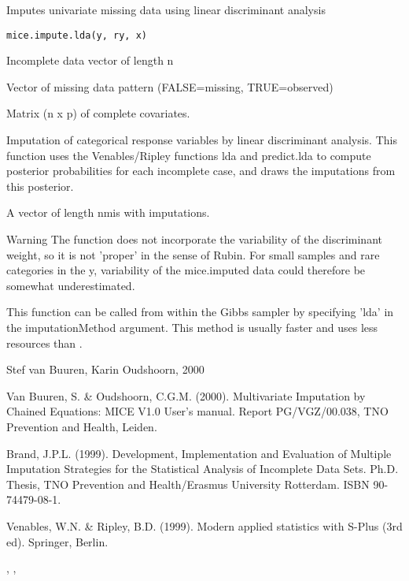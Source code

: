 \begin{Description}\relax
Imputes univariate missing data using linear discriminant analysis
\end{Description}
\begin{Usage}
\begin{verbatim}
mice.impute.lda(y, ry, x)
\end{verbatim}
\end{Usage}
\begin{Arguments}
\begin{ldescription}
\item[\code{y}] Incomplete data vector of length n
\item[\code{ry}] Vector of missing data pattern (FALSE=missing, TRUE=observed)
\item[\code{x}] Matrix (n x p) of complete covariates.
\end{ldescription}
\end{Arguments}
\begin{Details}\relax
Imputation of categorical response variables by linear discriminant
analysis. This function uses the Venables/Ripley functions
lda and predict.lda to compute posterior probabilities for
each incomplete case, and draws the imputations from this 
posterior.
\end{Details}
\begin{Value}
A vector of length nmis with imputations.
\end{Value}
\begin{Section}{Warning}
The function does not incorporate the variability of the discriminant 
weight, so it is not 'proper' in the sense of Rubin. For small samples
and rare categories in the y, variability of the mice.imputed data could 
therefore be somewhat underestimated.
\end{Section}
\begin{Note}\relax
This function can be called from within the Gibbs sampler by specifying 
'lda' in the imputationMethod argument. 
This method is usually faster and uses less resources than 
.
\end{Note}
\begin{Author}\relax
Stef van Buuren, Karin Oudshoorn, 2000
\end{Author}
\begin{References}\relax
Van Buuren, S. \& Oudshoorn, C.G.M. (2000). Multivariate Imputation by Chained Equations: 
MICE V1.0 User's manual. Report PG/VGZ/00.038, TNO Prevention and Health, Leiden.

Brand, J.P.L. (1999). Development, Implementation and Evaluation of
Multiple Imputation Strategies for the Statistical Analysis of
Incomplete Data Sets.
Ph.D. Thesis, TNO Prevention and Health/Erasmus University Rotterdam. ISBN 90-74479-08-1. 

Venables, W.N. \& Ripley, B.D. (1999). Modern applied statistics with S-Plus (3rd ed). Springer, Berlin.
\end{References}
\begin{SeeAlso}\relax
{}, , 
\end{SeeAlso}

